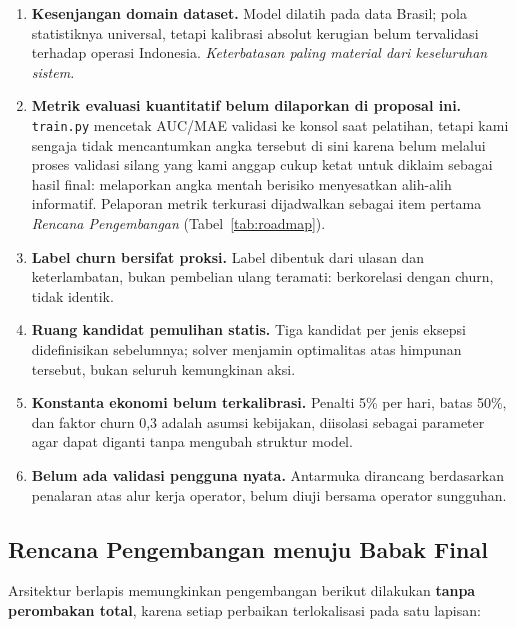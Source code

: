 \documentclass[12pt,a4paper]{article}
\begin{document}
\begin{enumerate}
  \item \textbf{Kesenjangan domain dataset.} Model dilatih pada data Brasil; pola statistiknya universal, tetapi kalibrasi absolut kerugian belum tervalidasi terhadap operasi Indonesia. \textit{Keterbatasan paling material dari keseluruhan sistem.}

  \item \textbf{Metrik evaluasi kuantitatif belum dilaporkan di proposal ini.} \texttt{train.py} mencetak AUC/MAE validasi ke konsol saat pelatihan, tetapi kami sengaja tidak mencantumkan angka tersebut di sini karena belum melalui proses validasi silang yang kami anggap cukup ketat untuk diklaim sebagai hasil final: melaporkan angka mentah berisiko menyesatkan alih-alih informatif. Pelaporan metrik terkurasi dijadwalkan sebagai item pertama \textit{Rencana Pengembangan} (Tabel~\ref{tab:roadmap}).

  \item \textbf{Label churn bersifat proksi.} Label dibentuk dari ulasan dan keterlambatan, bukan pembelian ulang teramati: berkorelasi dengan churn, tidak identik.

  \item \textbf{Ruang kandidat pemulihan statis.} Tiga kandidat per jenis eksepsi didefinisikan sebelumnya; solver menjamin optimalitas atas himpunan tersebut, bukan seluruh kemungkinan aksi.

  \item \textbf{Konstanta ekonomi belum terkalibrasi.} Penalti 5\% per hari, batas 50\%, dan faktor churn 0,3 adalah asumsi kebijakan, diisolasi sebagai parameter agar dapat diganti tanpa mengubah struktur model.

  \item \textbf{Belum ada validasi pengguna nyata.} Antarmuka dirancang berdasarkan penalaran atas alur kerja operator, belum diuji bersama operator sungguhan.
\end{enumerate}

\subsection{Rencana Pengembangan menuju Babak Final}

Arsitektur berlapis memungkinkan pengembangan berikut dilakukan \textbf{tanpa perombakan total}, karena setiap perbaikan terlokalisasi pada satu lapisan:
\end{document}
